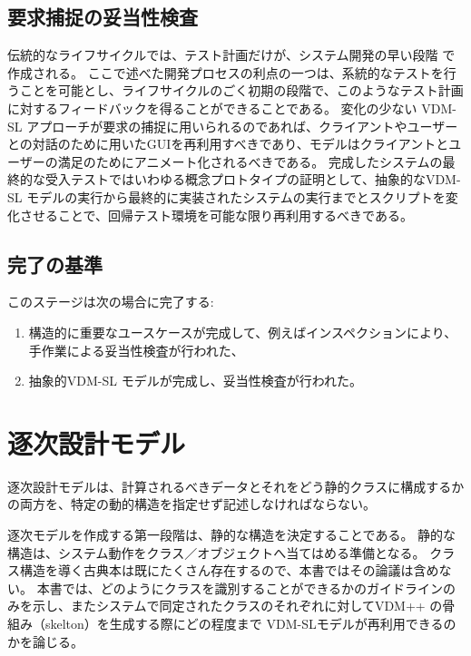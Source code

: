 \documentclass[\pformat,12pt]{jreport}
\begin{document}
\subsection{要求捕捉の妥当性検査}

伝統的なライフサイクルでは、テスト計画だけが、システム開発の早い段階 \cite{Sommerville82}で作成される。
ここで述べた開発プロセスの利点の一つは、系統的なテストを行うことを可能とし、ライフサイクルのごく初期の段階で、このようなテスト計画に対するフィードバックを得ることができることである。
変化の少ない VDM-SL アプローチが要求の捕捉に用いられるのであれば、クライアントやユーザーとの対話のために用いたGUIを再利用すべきであり、モデルはクライアントとユーザーの満足のためにアニメート化されるべきである。
完成したシステムの最終的な受入テストではいわゆる概念プロトタイプの証明として、抽象的なVDM-SL モデルの実行から最終的に実装されたシステムの実行までとスクリプトを変化させることで、回帰テスト環境を可能な限り再利用するべきである。

\subsection{完了の基準}

このステージは次の場合に完了する:

\begin{enumerate}
\item 構造的に重要なユースケースが完成して、例えばインスペクションにより、手作業による妥当性検査が行われた、
\item 抽象的VDM-SL モデルが完成し、妥当性検査が行われた。
\end{enumerate}

\section{逐次設計モデル}

逐次設計モデルは、計算されるべきデータとそれをどう静的クラスに構成するかの両方を、特定の動的構造を指定せず記述しなければならない。

逐次モデルを作成する第一段階は、静的な構造を決定することである。
静的な構造は、システム動作をクラス／オブジェクトへ当てはめる準備となる。
クラス構造を導く古典本は既にたくさん存在するので\cite{Rumbaugh&91,Meyer88, Douglass99}、本書ではその論議は含めない。
本書では、どのようにクラスを識別することができるかのガイドラインのみを示し、またシステムで同定されたクラスのそれぞれに対してVDM++ の骨組み（skelton）を生成する際にどの程度まで VDM-SLモデルが再利用できるのかを論じる。
\end{document}
